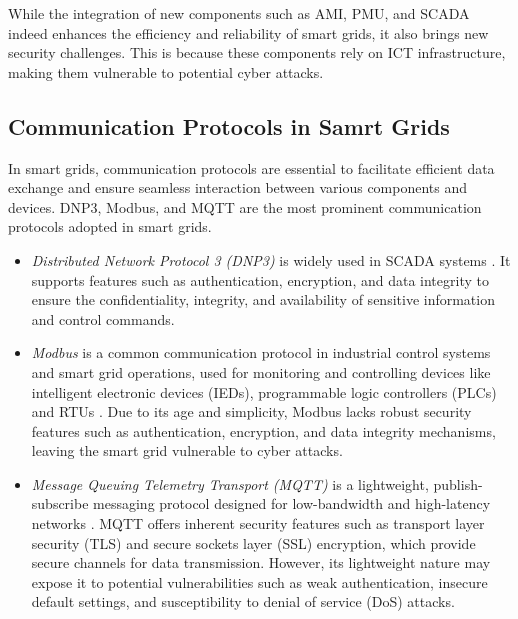 \documentclass[10pt, journal]{IEEEtran}
\begin{document}
While the integration of new components such as AMI, PMU, and SCADA indeed enhances the efficiency and reliability of smart grids, it also brings new security challenges. This is because these components rely on ICT infrastructure, making them vulnerable to potential cyber attacks.

\subsection{Communication Protocols in Samrt Grids}

In smart grids, communication protocols are essential to facilitate efficient data exchange and ensure seamless interaction between various components and devices. DNP3, Modbus, and MQTT are the most prominent communication protocols adopted in smart grids. 

\begin{itemize}

\item {\it Distributed Network Protocol 3 (DNP3)} is widely used in SCADA systems \cite{majdalawieh2006dnpsec}. It supports features such as authentication, encryption, and data integrity to ensure the confidentiality, integrity, and availability of sensitive information and control commands. 
		
\item {\it Modbus} is a common communication protocol in industrial control systems and smart grid operations, used for monitoring and controlling devices like intelligent electronic devices (IEDs), programmable logic controllers (PLCs) and RTUs \cite{swales1999open}. Due to its age and simplicity, Modbus lacks robust security features such as authentication, encryption, and data integrity mechanisms, leaving the smart grid vulnerable to cyber attacks.
		
\item {\it Message Queuing Telemetry Transport (MQTT)} is a lightweight, publish-subscribe messaging protocol designed for low-bandwidth and high-latency networks \cite{standard2014mqtt}. MQTT offers inherent security features such as transport layer security (TLS) and secure sockets layer (SSL) encryption, which provide secure channels for data transmission. However, its lightweight nature may expose it to potential vulnerabilities such as weak authentication, insecure default settings, and susceptibility to denial of service (DoS) attacks. 	

\end{itemize}
\end{document}
